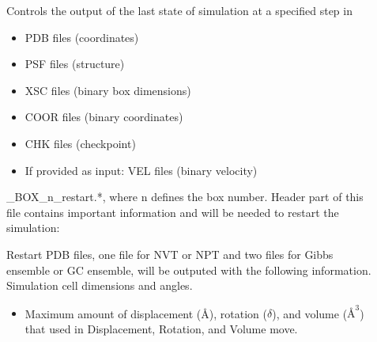 \documentclass[letterpaper,10pt,english]{sphinxmanual}
\begin{document}
\begin{description}
\item[{}] \leavevmode
\sphinxAtStartPar
Controls the output of the last state of simulation at a specified step in
\begin{itemize}
\item {} 
\sphinxAtStartPar
PDB files (coordinates)

\item {} 
\sphinxAtStartPar
PSF files (structure)

\item {} 
\sphinxAtStartPar
XSC files (binary box dimensions)

\item {} 
\sphinxAtStartPar
COOR files (binary coordinates)

\item {} 
\sphinxAtStartPar
CHK files (checkpoint)

\item {} 
\sphinxAtStartPar
If provided as input: VEL files (binary velocity)

\end{itemize}

\sphinxAtStartPar
{}\_BOX\_n\_restart.*, where n defines the box number. Header part of this file contains
important information and will be needed to restart the simulation:

\sphinxAtStartPar
Restart PDB files, one file for NVT or NPT and two files for Gibbs ensemble or GC ensemble, will be outputed with the following information.
\sphinxhyphen{} Simulation cell dimensions and angles.
\begin{itemize}
\item {} 
\sphinxAtStartPar
Maximum amount of displacement (Å), rotation (\(\delta\)), and volume (\(Å^3\)) that used in Displacement, Rotation, and Volume move.

\end{itemize}

\end{description}
\end{document}

